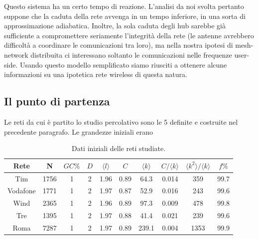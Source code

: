 Questo sistema ha un certo tempo di reazione. L'analisi da noi svolta pertanto suppone che la caduta della rete avvenga in un tempo inferiore, in una sorta di approssimazione adiabatica. Inoltre, la sola caduta degli hub sarebbe già sufficiente a compromettere seriamente l'integrità della rete (le antenne avrebbero difficoltà a coordinare le comunicazioni tra loro), ma nella nostra ipotesi di mesh-network distribuita ci interessano soltanto le comunicazioni nelle frequenze user-side. Usando questo modello semplificato siamo riusciti a ottenere alcune informazioni su una ipotetica rete wireless di questa natura.

\subsection{Il punto di partenza}
Le reti da cui è partito lo studio percolativo sono le 5 definite e costruite nel precedente paragrafo. Le grandezze iniziali erano


\begin{table}[t]
\caption{Dati iniziali delle reti studiate.}
	\begin{tabular}{cccccccccc}
	\toprule
	Rete		&N		&$GC\%$	&$D$	&$\langle l\rangle$	&$C$		&$\langle k\rangle$	&$C/\langle k\rangle$	&$\langle k^2\rangle/\langle k\rangle$	&$f\%$\\
	\midrule  
	Tim		&1756	&1		&2	&1.96			&0.89	&64.3			&0.014				&359							&99.7\\
	Vodafone	&1771	&1		&2	&1.97			&0.87	&52.9			&0.016				&243							&99.6\\
	Wind		&2365	&1		&2	&1.96			&0.89	&97.3			&0.009				&478							&99.8\\
	Tre		&1395	&1		&2	&1.97			&0.88	&41.4			&0.021				&239							&99.6\\
	Roma		&7287	&1		&2	&1.97			&0.89	&239.1			&0.004				&1353							&99.9\\
	\bottomrule
	\end{tabular}
\label{tab:datiInitial}
\end{table}

